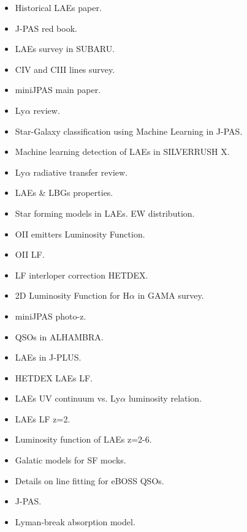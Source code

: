 \documentclass[a4paper,fleqn,usenatbib]{mnras}
\begin{document}
\begin{itemize}
    \item Historical LAEs paper. \cite{Partridge1967}
    \item J-PAS red book. \cite{benitez2014jpas}
    \item LAEs survey in SUBARU. \cite{ouchi2018}
    \item CIV and CIII lines survey. \cite{stroe2017}
    \item miniJPAS main paper. \cite{bonoli2020}
    \item Ly$\alpha$ review. \cite{ouchi2020}
    \item Star-Galaxy classification using Machine Learning in J-PAS. \cite{baqui2021}
    \item Machine learning detection of LAEs in SILVERRUSH X. \cite{ono2021}
    \item Ly$\alpha$ radiative transfer review. \cite{Dijkstra2019}
    \item LAEs \& LBGs properties. \cite{ArrabalHaro2020}
    \item Star forming models in LAEs. EW distribution. \cite{Charlot1993}
    \item OII emitters Luminosity Function. \cite{Ciardullo2013}
    \item OII LF. \cite{Gilbank2010}
    \item LF interloper correction HETDEX. \cite{Farrow2021}
    \item 2D Luminosity Function for H$\alpha$ in GAMA survey. \cite{Gunawardhana2002}
    \item miniJPAS photo-z. \cite{Hernan-Caballero2021}
    \item QSOs in ALHAMBRA. \cite{Matute2018}
    \item LAEs in J-PLUS. \cite{Spinoso2020}
    \item HETDEX LAEs LF. \cite{Zhang2021}
    \item LAEs UV continuum vs. Ly$\alpha$ luminosity relation. \cite{Santos2021}
    \item LAEs LF z=2. \cite{Konno2016}
    \item Luminosity function of LAEs z=2-6. \cite{Sobral2018}
    \item Galatic models for SF mocks. \cite{bruzual2003}
    \item Details on line fitting for eBOSS QSOs. \cite{bolton2012}
    \item J-PAS. \cite{Benitez2014}
    \item Lyman-break absorption model. \cite{Faucher-Giguere2008}

\end{itemize}
\end{document}

